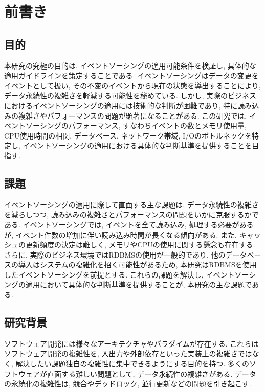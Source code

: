 \documentclass[../../main]{subfiles}
\begin{document}
    \section{前書き}\label{sec:preface}

    \subsection{目的}\label{subsec:preface-purpose}

    本研究の究極の目的は, イベントソーシングの適用可能条件を検証し, 具体的な適用ガイドラインを策定することである. イベントソーシングはデータの変更をイベントとして扱い, その不変のイベントから現在の状態を導出することにより, データ永続性の複雑さを軽減する可能性を秘めている. しかし, 実際のビジネスにおけるイベントソーシングの適用には技術的な判断が困難であり, 特に読み込みの複雑さやパフォーマンスの問題が顕著になることがある. この研究では, イベントソーシングのパフォーマンス, すなわちイベントの数とメモリ使用量, CPU使用時間の相関, データベース, ネットワーク帯域, I/Oのボトルネックを特定し, イベントソーシングの適用における具体的な判断基準を提供することを目指す.

    \subsection{課題}\label{subsec:preface-problem}

    イベントソーシングの適用に際して直面する主な課題は, データ永続性の複雑さを減らしつつ, 読み込みの複雑さとパフォーマンスの問題をいかに克服するかである. イベントソーシングでは, イベントを全て読み込み, 処理する必要があるが, イベント件数の増加に伴い読み込み時間が長くなる傾向がある. また, キャッシュの更新頻度の決定は難しく, メモリやCPUの使用に関する懸念も存在する. さらに, 実際のビジネス環境ではRDBMSの使用が一般的であり, 他のデータベースの導入はシステムの複雑化を招く可能性があるため, 本研究はRDBMSを使用したイベントソーシングを前提とする. これらの課題を解決し, イベントソーシングの適用において具体的な判断基準を提供することが, 本研究の主な課題である.

    \subsection{研究背景}\label{subsec:preface-motive}

    ソフトウェア開発には様々なアーキテクチャやパラダイムが存在する. これらはソフトウェア開発の複雑性を, 入出力や外部依存といった実装上の複雑さではなく, 解決したい課題独自の複雑性に集中できるようにする目的を持つ. 多くのソフトウェアが直面する難しい問題として, データ永続性の複雑さがある. データの永続化の複雑性は, 競合やデッドロック, 並行更新などの問題を引き起こす.
\end{document}
